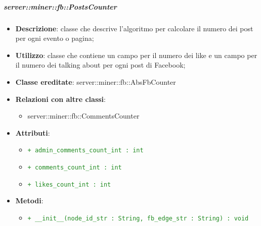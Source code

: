 	\subparagraph{server::miner::fb::PostsCounter} %
		\label{subp:server_miner_fb_PostsCounter}
			\begin{itemize}
				\item \textbf{Descrizione}: classe che descrive l'algoritmo per calcolare il numero dei post per ogni evento o pagina;
				\item \textbf{Utilizzo}: classe che contiene un campo per il numero dei like e un campo per il numero dei talking about per ogni post di Facebook;
				\item \textbf{Classe ereditate}: server::miner::fb::AbsFbCounter
				\item \textbf{Relazioni con altre classi}:
					\begin{itemize}
						\item server::miner::fb::CommentsCounter
					\end{itemize}
				\item \textbf{Attributi}:  
					\begin{itemize}
						\item \textcolor{forestgreen}{\texttt{+ admin\_comments\_count\_int : int}}
						\item \textcolor{forestgreen}{\texttt{+ comments\_count\_int : int}}
						\item \textcolor{forestgreen}{\texttt{+ likes\_count\_int : int}}
					\end{itemize}
				\item \textbf{Metodi}:  
					\begin{itemize}
						\item \textcolor{forestgreen}{\texttt{+ \_\_init\_\_(node\_id\_str : String, fb\_edge\_str : String) : void}}
\end{itemize}
\end{itemize}
